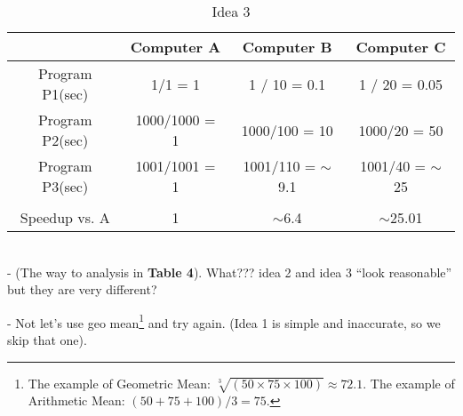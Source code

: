 \documentclass[12pt]{article}
\begin{document}
\begin{itemize}
\begin{itemize}
\begin{table}[]
                                        \begin{tabular}{cccc}
\hline
\multicolumn{1}{|c|}{}                & \multicolumn{1}{c|}{Computer A}    & \multicolumn{1}{c|}{Computer B}           & \multicolumn{1}{c|}{Computer C}         \\ \hline
\multicolumn{1}{|c|}{Program P1(sec)} & \multicolumn{1}{c|}{1/1 = 1}       & \multicolumn{1}{c|}{1 / 10 = 0.1}         & \multicolumn{1}{c|}{1 / 20 = 0.05}      \\ \hline
\multicolumn{1}{|c|}{Program P2(sec)} & \multicolumn{1}{c|}{1000/1000 = 1} & \multicolumn{1}{c|}{1000/100 = 10}        & \multicolumn{1}{c|}{1000/20 = 50}       \\ \hline
\multicolumn{1}{|c|}{Program P3(sec)} & \multicolumn{1}{c|}{1001/1001 = 1} & \multicolumn{1}{c|}{1001/110 = $\sim$9.1} & \multicolumn{1}{c|}{1001/40 = $\sim$25} \\ \hline
                                      &                                    &                                           &                                         \\ \hline
\multicolumn{1}{|c|}{Speedup vs. A}   & \multicolumn{1}{c|}{1}             & \multicolumn{1}{c|}{$\sim$6.4}            & \multicolumn{1}{c|}{$\sim$25.01}        \\ \hline
\end{tabular}
                                        \caption{Idea 3}
                                        \label{tab:my_label}
                                    \end{table}
                                    \\- (The way to analysis in \textbf{Table 4}). What??? idea 2 and idea 3 “look reasonable” but they are very different?
                            \end{itemize}
                \end{itemize}
            - Not let's use geo mean\footnote{The example of Geometric Mean: $\sqrt[3]{\left(50\times 75\times 100\right)}\approx 72.1$.  The example of Arithmetic Mean: $\left(50+75+100\right)/3 = 75$.} and try again. (Idea 1 is simple and inaccurate, so we skip that one).
\end{document}
